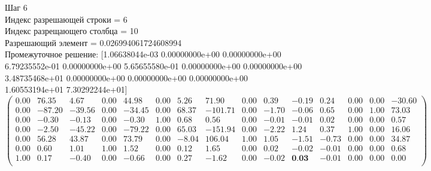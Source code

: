 \documentclass[draft]{article}
\begin{document}
\begin{flushleft}
    Шаг 6 \\
    Индекс разрешающей строки = 6\\
    Индекс разрещающего столбца = 10\\
    Разрешающий элемент = 0.026994061724608994\\
    Промежуточное решение:
    [1.06638044e-03  0.00000000e+00  0.00000000e+00  6.79235552e-01
    0.00000000e+00  5.65655580e-01  0.00000000e+00  0.00000000e+00
    3.48735468e+01  0.00000000e+00  0.00000000e+00  0.00000000e+00
    1.60553194e+01  7.30292244e+01]
\begin{equation*}
\begin{pmatrix}
    0.00 &  76.35 &   4.67 & 0.00 &  44.98 & 0.00 &  5.26 &   71.90 & 0.00 &  0.39 & -0.19 &  0.24 & 0.00 & 0.00 & -30.60 \\
    0.00 & -87.20 & -39.56 & 0.00 & -34.45 & 0.00 & 68.37 & -101.71 & 0.00 & -1.70 & -0.06 &  0.65 & 0.00 & 1.00 &  73.03 \\
    0.00 &  -0.30 &  -0.13 & 0.00 &  -0.30 & 1.00 &  0.68 &    0.56 & 0.00 & -0.01 & -0.01 &  0.02 & 0.00 & 0.00 &   0.57 \\
    0.00 &  -2.50 & -45.22 & 0.00 & -79.22 & 0.00 & 65.03 & -151.94 & 0.00 & -2.22 &  1.24 &  0.37 & 1.00 & 0.00 &  16.06 \\
    0.00 &  56.28 &  43.87 & 0.00 &  73.79 & 0.00 & -8.04 &  106.04 & 1.00 &  1.05 & -1.51 & -0.73 & 0.00 & 0.00 &  34.87 \\
    0.00 &   0.60 &   1.01 & 1.00 &   1.52 & 0.00 &  0.12 &    1.65 & 0.00 &  0.02 & -0.02 & -0.01 & 0.00 & 0.00 &   0.68 \\
    1.00 &   0.17 &  -0.40 & 0.00 &  -0.66 & 0.00 &  0.27 &   -1.62 & 0.00 & -0.02 &  \textbf{0.03} & -0.01 & 0.00 & 0.00 &   0.00 \\
\end{pmatrix}
\end{equation*}
\end{flushleft}
\end{document}
